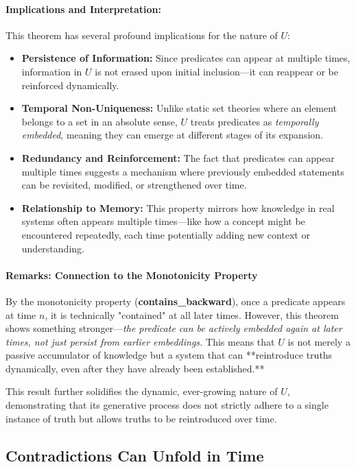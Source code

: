 \documentclass[12pt]{article}
\begin{document}
\paragraph{Implications and Interpretation:}
This theorem has several profound implications for the nature of \( U \):
\begin{itemize}
    \item \textbf{Persistence of Information:} Since predicates can appear at multiple times, information in \( U \) is not erased upon initial inclusion—it can reappear or be reinforced dynamically.
    \item \textbf{Temporal Non-Uniqueness:} Unlike static set theories where an element belongs to a set in an absolute sense, \( U \) treats predicates as \textit{temporally embedded}, meaning they can emerge at different stages of its expansion.
    \item \textbf{Redundancy and Reinforcement:} The fact that predicates can appear multiple times suggests a mechanism where previously embedded statements can be revisited, modified, or strengthened over time.
    \item \textbf{Relationship to Memory:} This property mirrors how knowledge in real systems often appears multiple times—like how a concept might be encountered repeatedly, each time potentially adding new context or understanding.
\end{itemize}

\paragraph{Remarks: Connection to the Monotonicity Property}
By the monotonicity property (\textbf{contains\_backward}), once a predicate appears at time \( n \), it is technically "contained" at all later times. However, this theorem shows something stronger—\textit{the predicate can be actively embedded again at later times, not just persist from earlier embeddings.} This means that \( U \) is not merely a passive accumulator of knowledge but a system that can **reintroduce truths dynamically, even after they have already been established.**

This result further solidifies the dynamic, ever-growing nature of \( U \), demonstrating that its generative process does not strictly adhere to a single instance of truth but allows truths to be reintroduced over time.


\subsection{Contradictions Can Unfold in Time}
\end{document}
